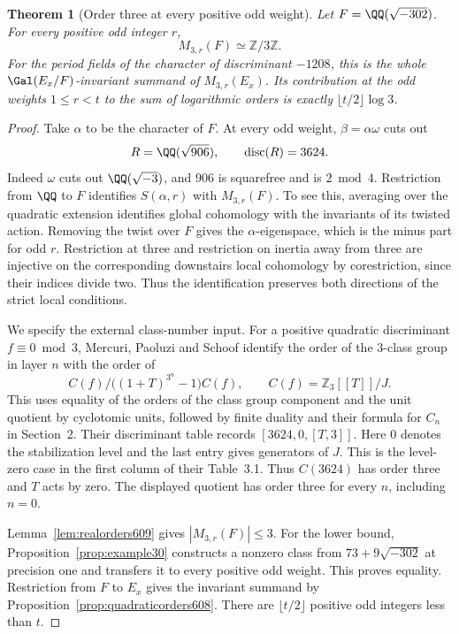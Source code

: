 \documentclass[a4paper,11pt]{article}
\newtheorem{theorem}[proposition]{Theorem}
\theoremstyle{definition}
\theoremstyle{remark}
\newcommand{\ZZ}{\mathbb Z}\newcommand{\ord}{\operatorname{ord}}
\numberwithin{equation}{section}
\begin{document}
\begin{theorem}[Order three at every positive odd weight]\leavevmode
\label{thm:exactthree609}
Let \(F=\QQ(\sqrt{-302})\). For every positive odd integer \(r\),
\[
                  M_{3,r}(F)\simeq\ZZ/3\ZZ .
\]
For the period fields of the character of discriminant \(-1208\),
this is the whole \(\Gal(E_x/F)\)-invariant summand of
\(M_{3,r}(E_x)\). Its contribution at the odd weights \(1\le r<t\)
to the sum of logarithmic orders is exactly
\(\lfloor t/2\rfloor\log 3\).
\end{theorem}
\begin{proof}
Take \(\alpha\) to be the character of \(F\).
At every odd weight, \(\beta=\alpha\omega\) cuts out
\[
                R=\QQ(\sqrt{906}),\qquad
                \operatorname{disc}(R)=3624 .
\]
Indeed \(\omega\) cuts out \(\QQ(\sqrt{-3})\), and \(906\)
is squarefree and is \(2\bmod4\). Restriction from \(\QQ\)
to \(F\) identifies \(S(\alpha,r)\) with \(M_{3,r}(F)\).
To see this, averaging over the quadratic extension identifies
global cohomology with the invariants of its twisted action.
Removing the twist over \(F\) gives the \(\alpha\)-eigenspace,
which is the minus part for odd \(r\). Restriction at three
and restriction on inertia away from three are injective on
the corresponding downstairs local cohomology by corestriction,
since their indices divide two. Thus the identification
preserves both directions of the strict local conditions.

We specify the external class-number input. For a positive
quadratic discriminant \(f\equiv0\bmod3\), Mercuri, Paoluzi
and Schoof identify the order of the \(3\)-class group in layer
\(n\) with the order of
\[
  C(f)/\bigl((1+T)^{3^n}-1\bigr)C(f),
      \qquad C(f)=\ZZ_3[[T]]/J .
\]
This uses equality of the orders of the class group component
and the unit quotient by cyclotomic units, followed by finite
duality and their formula for \(C_n\) in Section~2.
Their discriminant table records \([3624,0,[T,3]]\).
Here \(0\) denotes the stabilization level and the last entry
gives generators of \(J\). This is the level-zero case in the
first column of their Table~3.1. Thus \(C(3624)\) has order
three and \(T\) acts by zero. The displayed quotient has order
three for every \(n\), including \(n=0\).
~\cite{IV-II-mps609,IV-II-mpsdata609}

Lemma~\ref{lem:realorders609} gives \(|M_{3,r}(F)|\le3\).
For the lower bound, Proposition~\ref{prop:example30} constructs
a nonzero class from \(73+9\sqrt{-302}\) at precision one and
transfers it to every positive odd weight. This proves equality.
Restriction from \(F\) to \(E_x\) gives the invariant summand
by Proposition~\ref{prop:quadraticorders608}. There are
\(\lfloor t/2\rfloor\) positive odd integers less than \(t\).
\end{proof}
\end{document}
